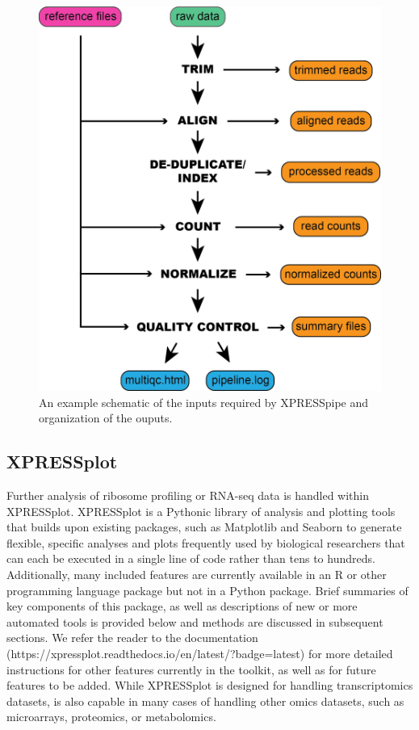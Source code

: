 \documentclass[11pt, a4paper, oneside]{article}
\begin{document}
\begin{figure}
\centering
  \includegraphics[width=120mm]{figures/xpresspipe_overview.png}
  \caption{An example schematic of the inputs required by XPRESSpipe and organization of the ouputs.}
  \label{fig:outputs}
\end{figure}


\subsection{XPRESSplot}
Further analysis of ribosome profiling or RNA-seq data is handled within XPRESSplot. XPRESSplot is a Pythonic library of analysis and plotting tools that builds upon existing packages, such as Matplotlib \cite{matplotlib} and Seaborn \cite{seaborn} to generate flexible, specific analyses and plots frequently used by biological researchers that can each be executed in a single line of code rather than tens to hundreds. Additionally, many included features are currently available in an R or other programming language package but not in a Python package. Brief summaries of key components of this package, as well as descriptions of new or more automated tools is provided below and methods are discussed in subsequent sections. We refer the reader to the documentation (https://xpressplot.readthedocs.io/en/latest/?badge=latest) for more detailed instructions for other features currently in the toolkit, as well as for future features to be added. While XPRESSplot is designed for handling transcriptomics datasets, is also capable in many cases of handling other omics datasets, such as microarrays, proteomics, or metabolomics.
\end{document}
